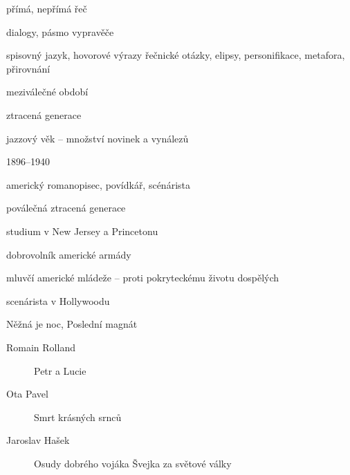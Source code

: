 { %
přímá, nepřímá řeč

dialogy, pásmo vypravěče

\newpart

spisovný jazyk, hovorové výrazy
řečnické otázky, elipsy, personifikace, metafora, přirovnání

\begin{compactitem}
	\item meziválečné období
	\item ztracená generace
	\item jazzový věk -- množství novinek a vynálezů
\end{compactitem}

\parag{\getauthor}
\begin{compactitem}
	\item 1896--1940
	\item americký romanopisec, povídkář, scénárista
	\item poválečná ztracená generace
	\item studium v New Jersey a Princetonu
	\item dobrovolník americké armády
	\item mluvčí americké mládeže -- proti pokryteckému životu dospělých
	\item scenárista v Hollywoodu
	\item Něžná je noc, Poslední magnát
\end{compactitem}

\begin{description}
	\item[Romain Rolland] Petr a Lucie
	\item[Ota Pavel] Smrt krásných srnců
	\item[Jaroslav Hašek] Osudy dobrého vojáka Švejka za světové války
\end{description}
}

